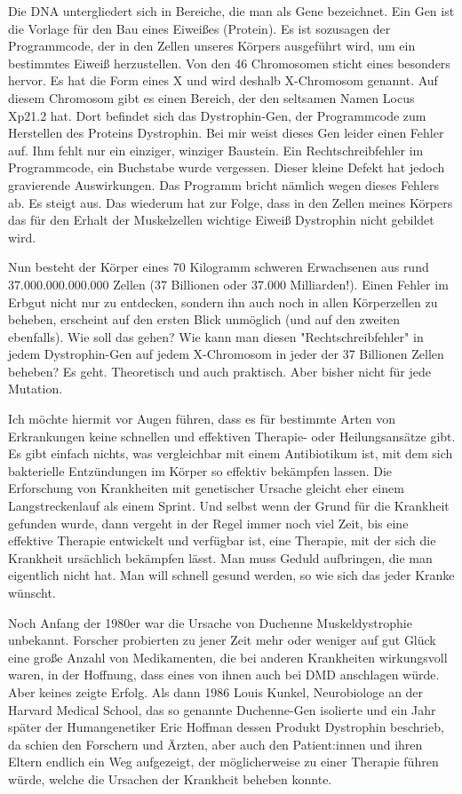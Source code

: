 \documentclass[fontsize=14pt,a4paper,headinclude,DIV=calc,automark]{scrbook}
\begin{document}
Die DNA untergliedert sich in Bereiche, die man als Gene bezeichnet. Ein Gen ist die Vorlage für den Bau eines Eiweißes (Protein). Es ist sozusagen der Programmcode, der in den Zellen unseres Körpers ausgeführt wird, um ein bestimmtes Eiweiß herzustellen. Von den 46 Chromosomen sticht eines besonders hervor. Es hat die Form eines X und wird deshalb X-Chromosom genannt. Auf diesem Chromosom gibt es einen Bereich, der den seltsamen Namen Locus Xp21.2 hat. Dort befindet sich das Dystrophin-Gen, der Programmcode zum Herstellen des Proteins Dystrophin. Bei mir weist dieses Gen leider einen Fehler auf. Ihm fehlt nur ein einziger, winziger Baustein. Ein Rechtschreibfehler im Programmcode, ein Buchstabe wurde vergessen. Dieser kleine Defekt hat jedoch gravierende Auswirkungen. Das Programm bricht nämlich wegen dieses Fehlers ab. Es steigt aus. Das wiederum hat zur Folge, dass in den Zellen meines Körpers das für den Erhalt der Muskelzellen wichtige Eiweiß Dystrophin nicht gebildet wird.

Nun besteht der Körper eines 70 Kilogramm schweren Erwachsenen aus rund 37.000.000.000.000 Zellen (37 Billionen oder 37.000 Milliarden!). Einen Fehler im Erbgut nicht nur zu entdecken, sondern ihn auch noch in allen Körperzellen zu beheben, erscheint auf den ersten Blick unmöglich (und auf den zweiten ebenfalls). Wie soll das gehen? Wie kann man diesen "Rechtschreibfehler" in jedem Dystrophin-Gen auf jedem X-Chromosom in jeder der 37 Billionen Zellen beheben? Es geht. Theoretisch und auch praktisch. Aber bisher nicht für jede Mutation.

Ich möchte hiermit vor Augen führen, dass es für bestimmte Arten von Erkrankungen keine schnellen und effektiven Therapie- oder Heilungsansätze gibt. Es gibt einfach nichts, was vergleichbar mit einem Antibiotikum ist, mit dem sich bakterielle Entzündungen im Körper so effektiv bekämpfen lassen. Die Erforschung von Krankheiten mit genetischer Ursache gleicht eher einem Langstreckenlauf als einem Sprint. Und selbst wenn der Grund für die Krankheit gefunden wurde, dann vergeht in der Regel immer noch viel Zeit, bis eine effektive Therapie entwickelt und verfügbar ist, eine Therapie, mit der sich die Krankheit ursächlich bekämpfen lässt. Man muss Geduld aufbringen, die man eigentlich nicht hat. Man will schnell gesund werden, so wie sich das jeder Kranke wünscht.

Noch Anfang der 1980er war die Ursache von Duchenne Muskeldystrophie unbekannt. Forscher probierten zu jener Zeit mehr oder weniger auf gut Glück eine große Anzahl von Medikamenten, die bei anderen Krankheiten wirkungsvoll waren, in der Hoffnung, dass eines von ihnen auch bei DMD anschlagen würde. Aber keines zeigte Erfolg. Als dann 1986 Louis Kunkel, Neurobiologe an der Harvard Medical School, das so genannte Duchenne-Gen isolierte und ein Jahr später der Humangenetiker Eric Hoffman dessen Produkt Dystrophin beschrieb, da schien den Forschern und Ärzten, aber auch den Patient:innen und ihren Eltern endlich ein Weg aufgezeigt, der möglicherweise zu einer Therapie führen würde, welche die Ursachen der Krankheit beheben konnte.
\end{document}
